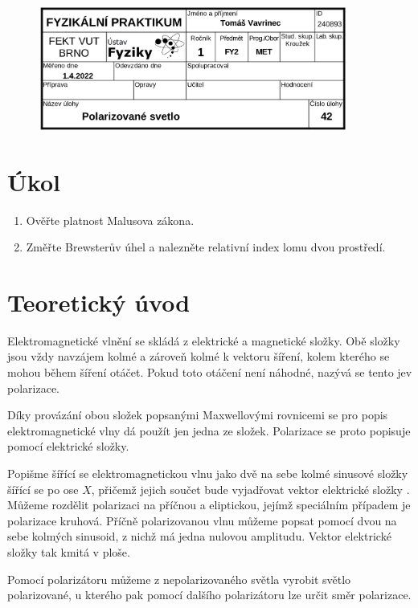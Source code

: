 \documentclass{article}
\begin{document}
\begin{figure}[H]
    \centering
    \includegraphics[width=0.9\textwidth]{hlavička.png}
\end{figure}

\small
\section{Úkol}
\begin{enumerate}
    \item Ověřte platnost Malusova zákona.
    \item Změřte Brewsterův úhel a nalezněte relativní index lomu dvou prostředí.
\end{enumerate}

\section{Teoretický úvod}
Elektromagnetické vlnění se skládá z elektrické  a magnetické  složky.
Obě složky jsou vždy navzájem kolmé a zároveň kolmé k vektoru šíření, kolem kterého se mohou během šíření otáčet.
Pokud toto otáčení není náhodné, nazývá se tento jev polarizace.

Díky provázání obou složek popsanými Maxwellovými rovnicemi se pro popis elektromagnetické vlny dá použít jen jedna ze složek.
Polarizace se proto popisuje pomocí elektrické složky.

Popišme šířící se elektromagnetickou vlnu jako dvě na sebe kolmé sinusové složky šířící se po ose \(X\), přičemž jejich součet bude vyjadřovat vektor elektrické složky .
Můžeme rozdělit polarizaci na příčnou a eliptickou, jejímž speciálním případem je polarizace kruhová.
Příčně polarizovanou vlnu můžeme popsat pomocí dvou na sebe kolmých sinusoid, z nichž má jedna nulovou amplitudu.
Vektor elektrické složky tak kmitá v ploše.

Pomocí polarizátoru můžeme z nepolarizovaného světla vyrobit světlo polarizované, u kterého pak pomocí dalšího polarizátoru lze určit směr polarizace.
\end{document}
